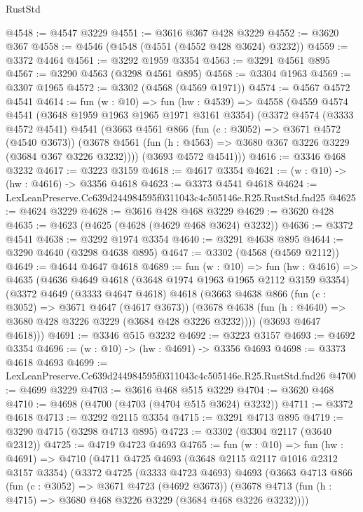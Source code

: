 \begin{lexlean}{RustStd}
\begin{coremodule}
@4548 := @4547 @3229
@4551 := @3616 @367 @428 @3229
@4552 := @3620 @367
@4558 := @4546 (@4548 (@4551 (@4552 @428 @3624) @3232))
@4559 := @3372 @4464
@4561 := @3292 @1959 @3354
@4563 := @3291 @4561 @895
@4567 := @3290 @4563 (@3298 @4561 @895)
@4568 := @3304 @1963
@4569 := @3307 @1965
@4572 := @3302 (@4568 (@4569 @1971))
@4574 := @4567 @4572 @4541
@4614 := fun (w : @10) =>
  fun (hw : @4539) =>
  @4558
    (@4559
      @4574
      @4541
      (@3648 @1959 @1963 @1965 @1971 @3161 @3354)
      (@3372
        @4574
        (@3333 @4572 @4541)
        @4541
        (@3663
          @4561
          @866
          (fun (c : @3052) => @3671 @4572 (@4540 @3673))
          (@3678 @4561 (fun (h : @4563) => @3680 @367 @3226 @3229 (@3684 @367 @3226 @3232))))
        (@3693 @4572 @4541)))
@4616 := @3346 @468 @3232
@4617 := @3223 @3159
@4618 := @4617 @3354
@4621 := (w : @10) -> (hw : @4616) -> @3356 @4618
@4623 := @3373 @4541 @4618
@4624 := LexLeanPreserve.Cc639d244984595f0311043c4c505146e.R25.RustStd.fnd25
@4625 := @4624 @3229
@4628 := @3616 @428 @468 @3229
@4629 := @3620 @428
@4635 := @4623 (@4625 (@4628 (@4629 @468 @3624) @3232))
@4636 := @3372 @4541
@4638 := @3292 @1974 @3354
@4640 := @3291 @4638 @895
@4644 := @3290 @4640 (@3298 @4638 @895)
@4647 := @3302 (@4568 (@4569 @2112))
@4649 := @4644 @4647 @4618
@4689 := fun (w : @10) =>
  fun (hw : @4616) =>
  @4635
    (@4636
      @4649
      @4618
      (@3648 @1974 @1963 @1965 @2112 @3159 @3354)
      (@3372
        @4649
        (@3333 @4647 @4618)
        @4618
        (@3663
          @4638
          @866
          (fun (c : @3052) => @3671 @4647 (@4617 @3673))
          (@3678 @4638 (fun (h : @4640) => @3680 @428 @3226 @3229 (@3684 @428 @3226 @3232))))
        (@3693 @4647 @4618)))
@4691 := @3346 @515 @3232
@4692 := @3223 @3157
@4693 := @4692 @3354
@4696 := (w : @10) -> (hw : @4691) -> @3356 @4693
@4698 := @3373 @4618 @4693
@4699 := LexLeanPreserve.Cc639d244984595f0311043c4c505146e.R25.RustStd.fnd26
@4700 := @4699 @3229
@4703 := @3616 @468 @515 @3229
@4704 := @3620 @468
@4710 := @4698 (@4700 (@4703 (@4704 @515 @3624) @3232))
@4711 := @3372 @4618
@4713 := @3292 @2115 @3354
@4715 := @3291 @4713 @895
@4719 := @3290 @4715 (@3298 @4713 @895)
@4723 := @3302 (@3304 @2117 (@3640 @2312))
@4725 := @4719 @4723 @4693
@4765 := fun (w : @10) =>
  fun (hw : @4691) =>
  @4710
    (@4711
      @4725
      @4693
      (@3648 @2115 @2117 @1016 @2312 @3157 @3354)
      (@3372
        @4725
        (@3333 @4723 @4693)
        @4693
        (@3663
          @4713
          @866
          (fun (c : @3052) => @3671 @4723 (@4692 @3673))
          (@3678 @4713 (fun (h : @4715) => @3680 @468 @3226 @3229 (@3684 @468 @3226 @3232))))

\end{coremodule}
\end{lexlean}
